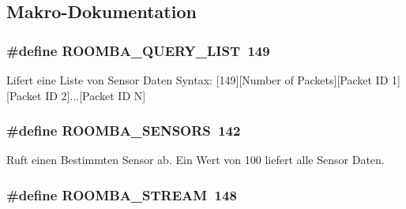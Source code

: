 \subsection{Makro-\/\-Dokumentation}
\hypertarget{group__roomba__commands__sensor_gaa4ae696773b751ed0b4828ebe3861d69}{
\subsubsection[{R\-O\-O\-M\-B\-A\-\_\-\-Q\-U\-E\-R\-Y\-\_\-\-L\-I\-S\-T}]{\setlength{\rightskip}{0pt plus 5cm}\#define R\-O\-O\-M\-B\-A\-\_\-\-Q\-U\-E\-R\-Y\-\_\-\-L\-I\-S\-T~149}}\label{group__roomba__commands__sensor_gaa4ae696773b751ed0b4828ebe3861d69}
Lifert eine Liste von Sensor Daten Syntax\-: \mbox{[}149\mbox{]}\mbox{[}Number of Packets\mbox{]}\mbox{[}Packet I\-D 1\mbox{]}\mbox{[}Packet I\-D 2\mbox{]}...\mbox{[}Packet I\-D N\mbox{]} \hypertarget{group__roomba__commands__sensor_gaef0d27b1b9b49c6aaa0a7241e7e41201}{
\subsubsection[{R\-O\-O\-M\-B\-A\-\_\-\-S\-E\-N\-S\-O\-R\-S}]{\setlength{\rightskip}{0pt plus 5cm}\#define R\-O\-O\-M\-B\-A\-\_\-\-S\-E\-N\-S\-O\-R\-S~142}}\label{group__roomba__commands__sensor_gaef0d27b1b9b49c6aaa0a7241e7e41201}
Ruft einen Bestimmten Sensor ab. Ein Wert von 100 liefert alle Sensor Daten. \hypertarget{group__roomba__commands__sensor_gafc6423e54083bd2b1abc99198bbbf739}{
\subsubsection[{R\-O\-O\-M\-B\-A\-\_\-\-S\-T\-R\-E\-A\-M}]{\setlength{\rightskip}{0pt plus 5cm}\#define R\-O\-O\-M\-B\-A\-\_\-\-S\-T\-R\-E\-A\-M~148}}\label{group__roomba__commands__sensor_gafc6423e54083bd2b1abc99198bbbf739}
